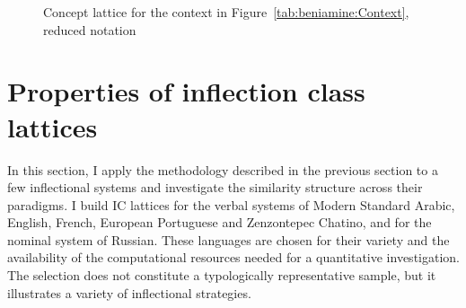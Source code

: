 \documentclass[output=paper]{langscibook}
\begin{document}
    \begin{figure}
        \caption{Concept lattice for the context in Figure~\ref{tab:beniamine:Context}, reduced notation}
        \label{fig:beniamine:latticeEn2}
    \end{figure}
    
    
    \section{Properties of inflection class lattices}
    \label{Section:beniamine:properies-of-IC-lattices}
    
    In this section, I apply the methodology described in the previous section to a few inflectional systems and investigate the similarity structure across their paradigms. I build IC lattices for the verbal systems of Modern Standard Arabic, English, French, European Portuguese and Zenzontepec Chatino, and for the nominal system of Russian. These languages are chosen for their variety and the availability of the computational resources needed for a quantitative investigation. The selection does not constitute a typologically representative sample, but it illustrates a variety of inflectional strategies. 
    
\end{document}
